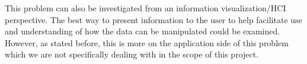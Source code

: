 \documentclass[12pt]{article}
\begin{document}
This problem can also be investigated from an information visualization/HCI perspective. The best way to present information to the user to help facilitate use and understanding of how the data can be manipulated could be examined. However, as stated before, this is more on the application side of this problem which we are not specifically dealing with in the scope of this project. 



\end{document}
